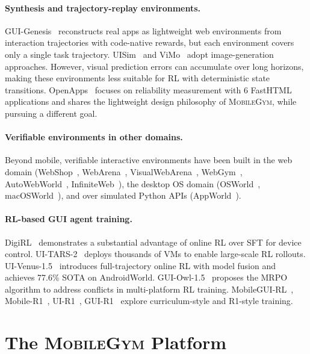 \documentclass{llmxive}
\providecommand{\sys}{\textsc{MobileGym}}
\begin{document}
\paragraph{Synthesis and trajectory-replay environments.} GUI-Genesis~\cite{GUI-GENESIS} reconstructs real apps as lightweight web environments from interaction trajectories with code-native rewards, but each environment covers only a single task trajectory. UISim~\cite{UISim} and ViMo~\cite{ViMo} adopt image-generation approaches. However, visual prediction errors can accumulate over long horizons, making these environments less suitable for RL with deterministic state transitions. OpenApps~\cite{OpenApps} focuses on reliability measurement with 6 FastHTML applications and shares the lightweight design philosophy of \sys{}, while pursuing a different goal.

\paragraph{Verifiable environments in other domains.} Beyond mobile, verifiable interactive environments have been built in the web domain (WebShop~\cite{WebShop}, WebArena~\cite{WebArena}, VisualWebArena~\cite{VisualWebArena}, WebGym~\cite{WebGym}, AutoWebWorld~\cite{AutoWebWorld}, InfiniteWeb~\cite{InfiniteWeb}), the desktop OS domain (OSWorld~\cite{OSWorld}, macOSWorld~\cite{macOSWorld}), and over simulated Python APIs (AppWorld~\cite{AppWorld}).

\paragraph{RL-based GUI agent training.} DigiRL~\cite{DigiRL} demonstrates a substantial advantage of online RL over SFT for device control. UI-TARS-2~\cite{UITARS2} deploys thousands of VMs to enable large-scale RL rollouts. UI-Venus-1.5~\cite{UIVenus15} introduces full-trajectory online RL with model fusion and achieves 77.6\% SOTA on AndroidWorld. GUI-Owl-1.5~\cite{GUIOw15} proposes the MRPO algorithm to address conflicts in multi-platform RL training. MobileGUI-RL~\cite{MobileGUIRL}, Mobile-R1~\cite{MobileR1}, UI-R1~\cite{UIR1}, GUI-R1~\cite{GUIR1} explore curriculum-style and R1-style training.


\section{The \sys{} Platform}\label{sec:system}
\end{document}
